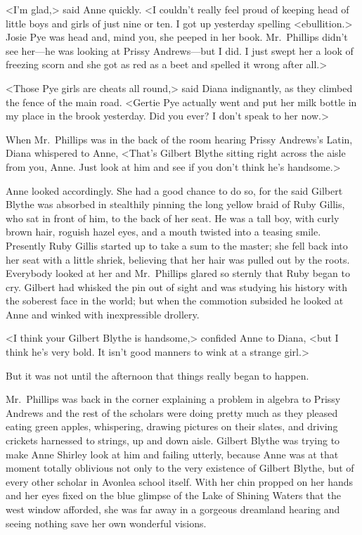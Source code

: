 <I'm glad,> said Anne quickly. <I couldn't really feel proud of keeping head of little boys and girls of just nine or ten. I got up yesterday spelling <ebullition.> Josie Pye was head and, mind you, she peeped in her book. Mr.~Phillips didn't see her—he was looking at Prissy Andrews—but I did. I just swept her a look of freezing scorn and she got as red as a beet and spelled it wrong after all.>

<Those Pye girls are cheats all round,> said Diana indignantly, as they climbed the fence of the main road. <Gertie Pye actually went and put her milk bottle in my place in the brook yesterday. Did you ever? I don't speak to her now.>

When Mr.~Phillips was in the back of the room hearing Prissy Andrews's Latin, Diana whispered to Anne, <That's Gilbert Blythe sitting right across the aisle from you, Anne. Just look at him and see if you don't think he's handsome.>

Anne looked accordingly. She had a good chance to do so, for the said Gilbert Blythe was absorbed in stealthily pinning the long yellow braid of Ruby Gillis, who sat in front of him, to the back of her seat. He was a tall boy, with curly brown hair, roguish hazel eyes, and a mouth twisted into a teasing smile. Presently Ruby Gillis started up to take a sum to the master; she fell back into her seat with a little shriek, believing that her hair was pulled out by the roots. Everybody looked at her and Mr.~Phillips glared so sternly that Ruby began to cry. Gilbert had whisked the pin out of sight and was studying his history with the soberest face in the world; but when the commotion subsided he looked at Anne and winked with inexpressible drollery.

<I think your Gilbert Blythe is handsome,> confided Anne to Diana, <but I think he's very bold. It isn't good manners to wink at a strange girl.>

But it was not until the afternoon that things really began to happen.

Mr.~Phillips was back in the corner explaining a problem in algebra to Prissy Andrews and the rest of the scholars were doing pretty much as they pleased eating green apples, whispering, drawing pictures on their slates, and driving crickets harnessed to strings, up and down aisle. Gilbert Blythe was trying to make Anne Shirley look at him and failing utterly, because Anne was at that moment totally oblivious not only to the very existence of Gilbert Blythe, but of every other scholar in Avonlea school itself. With her chin propped on her hands and her eyes fixed on the blue glimpse of the Lake of Shining Waters that the west window afforded, she was far away in a gorgeous dreamland hearing and seeing nothing save her own wonderful visions.

